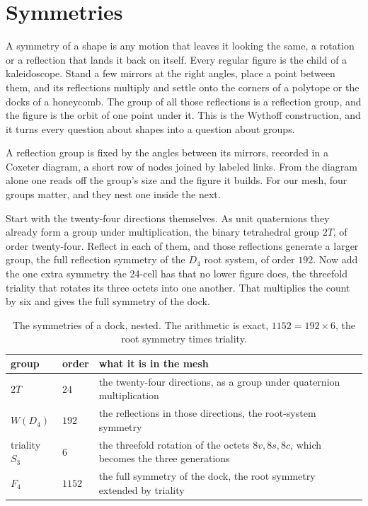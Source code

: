 \section{Symmetries}

A symmetry of a shape is any motion that leaves it looking the same, a rotation or a reflection that lands it back on itself. Every regular figure is the child of a kaleidoscope. Stand a few mirrors at the right angles, place a point between them, and its reflections multiply and settle onto the corners of a polytope or the docks of a honeycomb. The group of all those reflections is a reflection group, and the figure is the orbit of one point under it. This is the Wythoff construction, and it turns every question about shapes into a question about groups.

A reflection group is fixed by the angles between its mirrors, recorded in a Coxeter diagram, a short row of nodes joined by labeled links. From the diagram alone one reads off the group's size and the figure it builds. For our mesh, four groups matter, and they nest one inside the next.

Start with the twenty-four directions themselves. As unit quaternions they already form a group under multiplication, the binary tetrahedral group $2T$, of order twenty-four. Reflect in each of them, and those reflections generate a larger group, the full reflection symmetry of the $D_4$ root system, of order $192$. Now add the one extra symmetry the 24-cell has that no lower figure does, the threefold triality that rotates its three octets into one another. That multiplies the count by six and gives the full symmetry of the dock.

\begin{table}[ht]
\centering
\begin{tabular}{@{}llp{}@{}}
\toprule
group & order & what it is in the mesh \\
\midrule
$2T$ & $24$ & the twenty-four directions, as a group under quaternion multiplication \\
$W(D_4)$ & $192$ & the reflections in those directions, the root-system symmetry \\
triality $S_3$ & $6$ & the threefold rotation of the octets $8v, 8s, 8c$, which becomes the three generations \\
$F_4$ & $1152$ & the full symmetry of the dock, the root symmetry extended by triality \\
\bottomrule
\end{tabular}
\caption{The symmetries of a dock, nested. The arithmetic is exact, $1152 = 192 \times 6$, the root symmetry times triality.}
\label{tab:symmetries}
\end{table}

